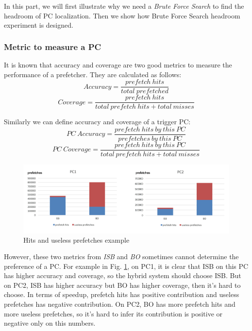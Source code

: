   In this part, we will first illustrate why we need a \emph{Brute Force Search} to find the headroom of PC localization. Then we show how Brute Force Search headroom experiment is designed. \par

  \subsubsection{Metric to measure a PC}
  \label{sec:metricPC}

  It is known that accuracy and coverage are two good metrics \cite{yalepaper} to measure the performance of a prefetcher. They are calculated as follows:
  \begin{equation}
  Accuracy = \frac{prefetch\ hits}{total\  prefetched}
  \end{equation}
  \begin{equation}
  Coverage = \frac{prefetch\ hits}{total\ prefetch\ hits + total\ misses}
  \end{equation}

  Similarly we can define accuracy and coverage of a trigger PC:
  \begin{equation}
  PC\ Accuracy = \frac{prefetch\ hits\ by\ this\ PC}{prefetches\ by\ this\ PC}
  \end{equation}
  \begin{equation}
  PC\ Coverage = \frac{prefetch\ hits\ by\ this\ PC}{total\ prefetch\ hits + total\ misses}
 \end{equation}

 \begin{figure}[ht!]
	\centering
	\includegraphics[width=1.0\textwidth]{images/metric.png}
	\caption{Hits and useless prefetches example}
	\label{fig:pcmetric}
\end{figure}

However, these two metrics from \emph{ISB} and \emph{BO} sometimes cannot determine the preference of a PC.
For example in Fig. \ref{fig:pcmetric}, on PC1, it is clear that ISB on this PC has higher accuracy and coverage, so the hybrid system should choose ISB. But on PC2, ISB has higher accuracy but BO has higher coverage, then it's hard to choose.
In terms of speedup, prefetch hits has positive contribution and useless prefetches has negative contribution.
On PC2, BO has more prefetch hits and more useless prefetches, so it's hard to infer its contribution is positive or negative only on this numbers.

